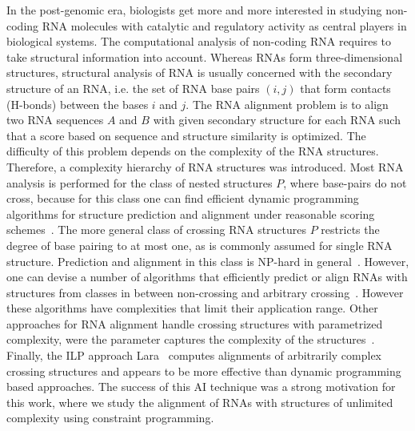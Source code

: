 \documentclass{easychair}
\begin{document}
In the post-genomic era, biologists get more and more interested in
studying non-coding RNA molecules with catalytic and regulatory
activity as central players in biological systems.
%
The computational analysis of non-coding RNA requires to take
structural information into account.
%
Whereas RNAs form three-dimensional structures, structural analysis of
RNA is usually concerned with the secondary structure of an RNA, i.e.
the set of RNA base pairs $(i,j)$ that form contacts (H-bonds) between
the bases $i$ and $j$. The RNA alignment problem is to align two RNA
sequences $A$ and $B$ with given secondary structure for each RNA such
that a score based on sequence and structure similarity is
optimized. The difficulty of this problem depends on the complexity of
the RNA structures. Therefore, a complexity hierarchy of RNA
structures was introduced. Most RNA analysis is performed for the
class of nested structures $P$, where base-pairs do not cross, because
for this class one can find efficient dynamic programming algorithms
for structure prediction and alignment under reasonable scoring
schemes~\cite{Zuker:Stiegler:Optim_compu_foldi:NAR1981,Jiang:Lin:Ma:Gener_Edit_Dista:JCB2002}. The
more general class of crossing RNA structures $P$ restricts the degree
of base pairing to at most one, as is commonly assumed for single
RNA structure. Prediction and alignment in this class is NP-hard in
general~\cite{blin07:_exten_hardn_rna_secon_struc_compar}. However,
one can devise a number of algorithms that efficiently predict or
align RNAs with structures from classes in between non-crossing and
arbitrary
crossing~\cite{Rivas:Eddy:dynam_progr_algor:JMB1999,Reeder:Giegerich:Desig_imple_and:2004,Moehl:Will:Backofen:PKalign:JCB2010}. However
these algorithms have complexities that limit their application range.
Other approaches for RNA alignment handle crossing structures with
parametrized complexity, were the parameter captures the complexity
of the
structures~\cite{%
Moehl:Will:Backofen:CPM2008}.
Finally, the ILP approach
Lara~\cite{Bauer:Klau:Reinert:Accur_multi_seque:2007} computes
alignments of arbitrarily complex crossing structures and appears to be more
effective than dynamic programming based approaches.  The success of
this AI technique was a strong motivation for this work, where we
study the alignment of RNAs with structures of unlimited complexity
using constraint programming.
\end{document}

